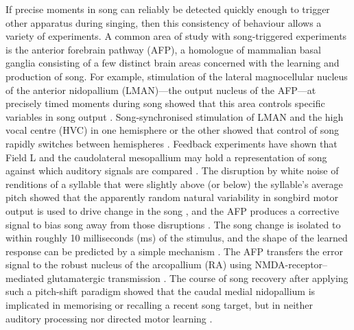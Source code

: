 \documentclass[10pt,letterpaper]{article}
\begin{document}
If precise moments in song can reliably be detected quickly enough to
trigger other apparatus during singing, then this consistency of
behaviour allows a variety of experiments.  A common area of study
with song-triggered experiments is the anterior forebrain pathway
(AFP), a homologue of mammalian basal ganglia consisting of a few
distinct brain areas concerned with the learning and production of
song.  For example, stimulation of the lateral magnocellular nucleus
of the anterior nidopallium (LMAN)---the output nucleus of the
AFP---at precisely timed moments during song showed that this area
controls specific variables in song output \cite{Kao2005}.
Song-synchronised stimulation of LMAN and the high vocal centre (HVC)
in one hemisphere or the other showed that control of song rapidly
switches between hemispheres \cite{Wang2008interhemispheric}.
Feedback experiments have shown that Field L and the caudolateral
mesopallium may hold a representation of song against which auditory
signals are compared \cite{Keller2009}.  The disruption by white noise
of renditions of a syllable that were slightly above (or below) the
syllable's average pitch showed that the apparently random natural
variability in songbird motor output is used to drive change in the
song \cite{Tumer2007pitchshift}, and the AFP produces a
corrective signal to bias song away from those disruptions
\cite{Andalman2009}. The song change is isolated to within roughly 10
milliseconds (ms) of the stimulus, and the shape of the learned
response can be predicted by a simple mechanism
\cite{Charlesworth2011learning}. The AFP transfers the error signal to the
robust nucleus of the arcopallium (RA) using NMDA-receptor--mediated
glutamatergic transmission \cite{Warren2011}. The course of song
recovery after applying such a pitch-shift paradigm showed that the
caudal medial nidopallium is implicated in memorising or recalling a
recent song target, but in neither auditory processing nor directed
motor learning \cite{Canopoli2014}.

\end{document}
